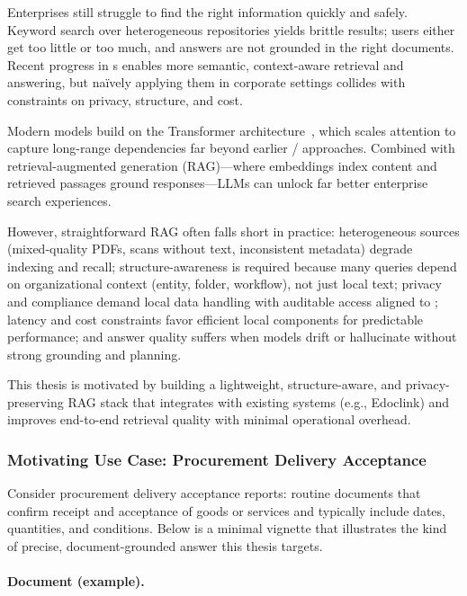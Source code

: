 Enterprises still struggle to find the right information quickly and safely. Keyword search over heterogeneous repositories yields brittle results; users either get too little or too much, and answers are not grounded in the right documents. Recent progress in s enables more semantic, context-aware retrieval and answering, but naïvely applying them in corporate settings collides with constraints on privacy, structure, and cost.

Modern models build on the Transformer architecture~\cite{vaswani2017attention}, which scales attention to capture long-range dependencies far beyond earlier / approaches. Combined with retrieval-augmented generation (\gls{RAG})—where embeddings index content and retrieved passages ground responses—LLMs can unlock far better enterprise search experiences.

However, straightforward \gls{RAG} often falls short in practice: heterogeneous sources (mixed-quality PDFs, scans without text, inconsistent metadata) degrade indexing and recall; structure-awareness is required because many queries depend on organizational context (entity, folder, workflow), not just local text; privacy and compliance demand local data handling with auditable access aligned to ; latency and cost constraints favor efficient local components for predictable performance; and answer quality suffers when models drift or hallucinate without strong grounding and planning.

This thesis is motivated by building a lightweight, structure-aware, and privacy-preserving \gls{RAG} stack that integrates with existing systems (e.g., Edoclink) and improves end-to-end retrieval quality with minimal operational overhead.

\subsubsection{Motivating Use Case: Procurement Delivery Acceptance}
\label{subsec:motivation-usecase}%
Consider procurement delivery acceptance reports: routine documents that confirm receipt and acceptance of goods or services and typically include dates, quantities, and conditions. Below is a minimal vignette that illustrates the kind of precise, document-grounded answer this thesis targets.

\paragraph{Document (example).}

